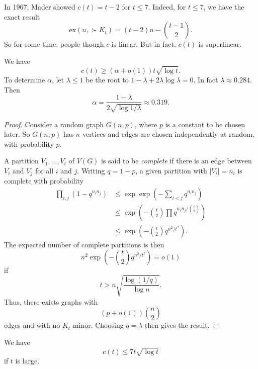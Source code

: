 \documentclass[a4paper]{article}
\renewcommand\ex{\mathrm{ex}}
\begin{document}
In 1967, Mader showed $c(t) = t - 2$ for $t \leq 7$. Indeed, for $t \leq 7$, we have the exact result
\[
  \ex(n, \succ K_t) = (t - 2) n - \binom{t - 1}{2}.
\]
So for some time, people though $c$ is linear. But in fact, $c(t)$ is superlinear.

\begin{lemma}
  We have
  \[
    c(t) \geq (\alpha + o(1)) t \sqrt{\log t}.
  \]
  To determine $\alpha$, let $\lambda \leq 1$ be the root to $1 - \lambda + 2 \lambda \log \lambda = 0$. In fact $\lambda \approx 0.284$. Then
  \[
    \alpha = \frac{1 - \lambda}{2 \sqrt{\log 1/\lambda}} \approx 0.319.
  \]
\end{lemma}

\begin{proof}
  Consider a random graph $G(n, p)$, where $p$ is a constant to be chosen later. So $G(n, p)$ has $n$ vertices and edges are chosen independently at random, with probability $p$.

  A partition $V_1, \ldots, V_t$ of $V(G)$ is said to be \emph{complete} if there is an edge between $V_i$ and $V_j$ for all $i$ and $j$. Writing $q = 1 - p$, a given partition with $|V_i| = n_i$ is complete with probability
  \begin{align*}
    \prod_{i, j}(1 - q^{n_i n_j}) &\leq \exp \exp\left(- \sum_{i < j} q^{n_i n_j}\right)\\
    &\leq \exp \left(- \binom{t}{2}\prod q^{n_i n_j/\binom{t}{2}}\right) \tag{AM-GM}\\
    &\leq \exp \left(- \binom{t}{2} q^{n^2/t^2}\right).\tag{Cauchy--Schwarz}
  \end{align*}
  The expected number of complete partitions is then
  \[
    n^2 \exp \left(- \binom{t}{2} q^{n^2/t^2}\right) = o(1)
  \]
  if
  \[
    t > n \sqrt{\frac{\log(1/q)}{\log n}}.
  \]
  Thus, there exists graphs with
  \[
    (p + o(1)) \binom{n}{2}
  \]
  edges and with no $K_t$ minor. Choosing $q = \lambda$ then gives the result.
\end{proof}

\begin{thm}
  We have
  \[
    c(t) \leq 7 t \sqrt{\log t}
  \]
  if $t$ is large.
\end{thm}
\end{document}
